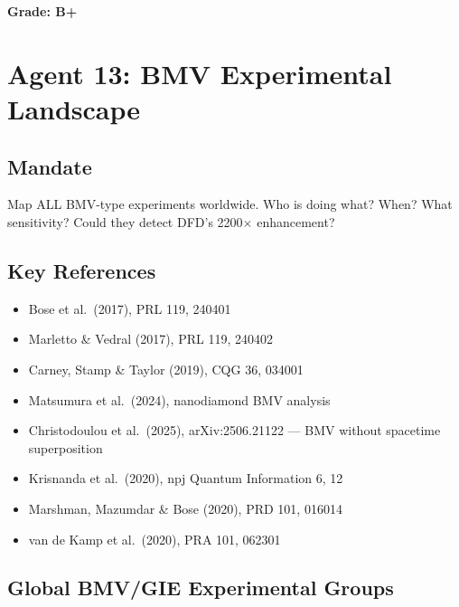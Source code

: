 \documentclass[11pt,a4paper]{article}
\begin{document}
\textbf{Grade: B+}

\section{Agent 13: BMV Experimental Landscape}
\label{sec:agent13}

\subsection{Mandate}

Map ALL BMV-type experiments worldwide. Who is doing what? When? What sensitivity? Could they detect DFD's 2200$\times$ enhancement?

\subsection{Key References}

\begin{itemize}
\item Bose et al.\ (2017), PRL 119, 240401
\item Marletto \& Vedral (2017), PRL 119, 240402
\item Carney, Stamp \& Taylor (2019), CQG 36, 034001
\item Matsumura et al.\ (2024), nanodiamond BMV analysis
\item Christodoulou et al.\ (2025), arXiv:2506.21122 --- BMV without spacetime superposition
\item Krisnanda et al.\ (2020), npj Quantum Information 6, 12
\item Marshman, Mazumdar \& Bose (2020), PRD 101, 016014
\item van de Kamp et al.\ (2020), PRA 101, 062301
\end{itemize}

\subsection{Global BMV/GIE Experimental Groups}
\end{document}
